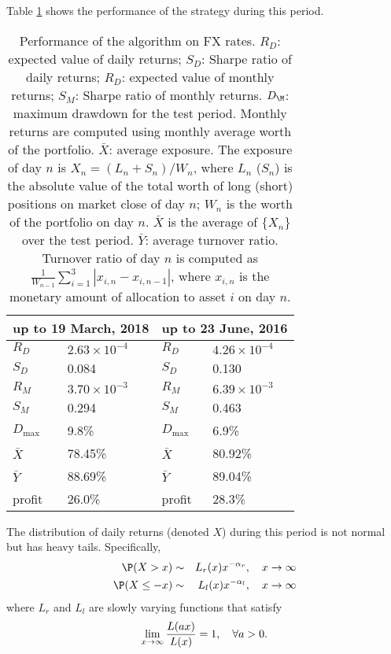 \documentclass[12pt]{article}
\begin{document}
Table \ref{tab:fx1} shows the performance of the strategy during this
period.
\begin{table}[htb!]
  \centering
  \begin{tabular}{ll||ll}
    \multicolumn{2}{c||}{up to 19 March, 2018}
    & \multicolumn{2}{c}{up to 23 June, 2016} \\
    \hline
    $R_D$ & $2.63 \times 10^{-4}$ & $R_D$ & $4.26 \times 10^{-4}$  \\
    $S_D$ & 0.084 & $S_D$ & 0.130 \\
    $R_M$ & $3.70 \times 10^{-3}$ & $R_M$ & $6.39 \times 10^{-3}$  \\
    $S_M$ & 0.294 & $S_M$ & 0.463 \\
    $D_{\text{max}}$ & 9.8\% & $D_{\text{max}}$ & 6.9\% \\
    $\bar X$ & 78.45\% & $\bar X$ & 80.92\% \\
    $\bar Y$ & 88.69\% & $\bar Y$ & 89.04\% \\
    profit & 26.0\% & profit & 28.3\%
  \end{tabular}
  \caption{
    Performance of the algorithm on FX rates.
    $R_D$: expected value of daily returns;
    $S_D$: Sharpe ratio of daily returns;
    $R_D$: expected value of monthly returns;
    $S_M$: Sharpe ratio of monthly returns.
    $D_\M$: maximum drawdown for the test period. Monthly
    returns are computed using monthly average worth of the
    portfolio.
    $\bar X$: average exposure. The exposure of day $n$ is
    $X_n = (L_n + S_n)/W_n$, where $L_n$ ($S_n$) is the absolute value
    of the total worth of long (short) positions on market close of
    day $n$; $W_n$ is the worth of the portfolio on day $n$. $\bar X$
    is the average of $\{X_n\}$ over the test period.
    $\bar Y$: average turnover ratio. Turnover ratio of day $n$ is
    computed as $\frac{1}{W_{n-1}}\sum_{i=1}^3 \left| x_{i, n} - x_{i,
        n-1} \right|$, where $x_{i, n}$ is the monetary amount of
    allocation to asset $i$ on day $n$.
  }
  \label{tab:fx1}
\end{table}
The distribution of daily returns (denoted $X$) during this period is
not normal but has heavy tails. Specifically,
\begin{eqnarray*}
  \P(X > x) &\sim& L_r(x) x^{-\alpha_r}, \quad x \to \infty \\
  \P(X \leq -x) &\sim& L_l(x) x^{-\alpha_l}, \quad x \to \infty
\end{eqnarray*}
where $L_r$ and $L_l$ are slowly varying functions that satisfy
\[
  \lim_{x \to \infty} {L(a x) \over L(x)} = 1, \quad \forall a > 0.
\]
\end{document}
